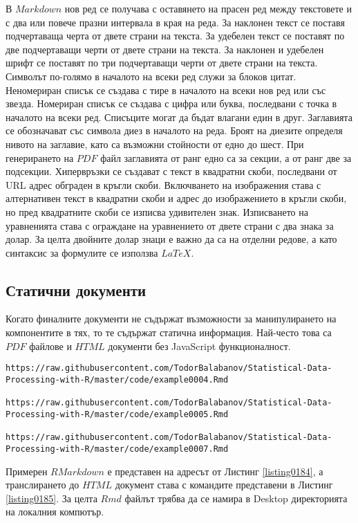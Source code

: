 В $Markdown$ нов ред се получава с оставянето на прасен ред между текстовете и с два или повече празни интервала в края на реда. За наклонен текст се поставя подчертаваща черта от двете страни на текста. За удебелен текст се поставят по две подчертаващи черти от двете страни на текста. За наклонен и удебелен шрифт се поставят по три подчертаващи черти от двете страни на текста. Символът по-голямо в началото на всеки ред служи за блоков цитат. Неномериран списък се създава с тире в началото на всеки нов ред или със звезда. Номериран списък се създава с цифра или буква, последвани с точка в началото на всеки ред. Списъците могат да бъдат влагани един в друг. Заглавията се обозначават със символа диез в началото на реда. Броят на диезите определя нивото на заглавие, като са възможни стойности от едно до шест. При генерирането на $PDF$ файл заглавията от ранг едно са за секции, а от ранг две за подсекции. Хипервръзки се създават с текст в квадратни скоби, последвани от URL адрес обграден в кръгли скоби. Включването на изображения става с алтернативен текст в квадратни скоби и адрес до изображението в кръгли скоби, но пред квадратните скоби се изписва удивителен знак. Изписването на уравненията става с ограждане на уравнението от двете страни с два знака за долар. За целта двойните долар знаци е важно да са на отделни редове, а като синтаксис за формулите се използва $LaTeX$. 

\subsection{Статични документи}

Когато финалните документи не съдържат възможности за манипулирането на компонентите в тях, то те съдържат статична информация. Най-често това са $PDF$ файлове и $HTML$ документи без JavaScript функционалност.

\begin{lstlisting}[caption=Адрес на примерни RMarkdown документ, label=listing0184]
https://raw.githubusercontent.com/TodorBalabanov/Statistical-Data-Processing-with-R/master/code/example0004.Rmd

https://raw.githubusercontent.com/TodorBalabanov/Statistical-Data-Processing-with-R/master/code/example0005.Rmd

https://raw.githubusercontent.com/TodorBalabanov/Statistical-Data-Processing-with-R/master/code/example0007.Rmd
\end{lstlisting}

Примерен $RMarkdown$ е представен на адресът от Листинг \ref{listing0184}, а транслирането до $HTML$ документ става с командите представени в Листинг \ref{listing0185}. За целта $Rmd$ файлът трябва да се намира в Desktop директорията на локалния компютър. 

